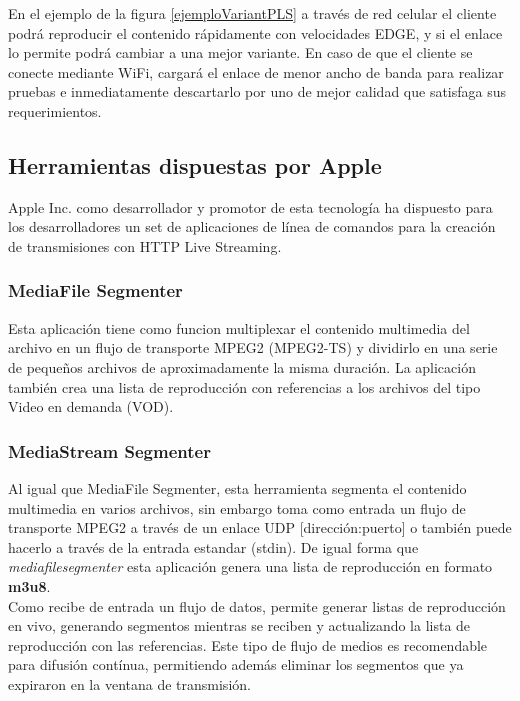 En el ejemplo de la figura \ref{ejemploVariantPLS} a través de red celular el cliente podrá reproducir el contenido rápidamente con velocidades EDGE, y si el enlace lo permite podrá cambiar a una mejor variante. En caso de que el cliente se conecte mediante WiFi, cargará el enlace de menor ancho de banda para realizar pruebas e inmediatamente descartarlo por uno de mejor calidad que satisfaga sus requerimientos.




	\subsection{Herramientas dispuestas por Apple}
	Apple Inc. como desarrollador y promotor de esta tecnología ha dispuesto para los desarrolladores un set de aplicaciones de línea de comandos para la creación de transmisiones con HTTP Live Streaming.
		\subsubsection{MediaFile Segmenter}
Esta aplicación tiene como funcion multiplexar el contenido multimedia del archivo en un flujo de transporte MPEG2 (MPEG2-TS) y dividirlo en una serie de pequeños archivos de aproximadamente la misma duración. La aplicación también crea una lista de reproducción con referencias a los archivos del tipo Video en demanda (VOD).

		\subsubsection{MediaStream Segmenter}
Al igual que MediaFile Segmenter, esta herramienta segmenta el contenido multimedia en varios archivos, sin embargo toma como entrada un flujo de transporte MPEG2 a través de un enlace UDP [dirección:puerto] o también puede hacerlo a través de la entrada estandar (stdin). De igual forma que \textit{mediafilesegmenter} esta aplicación genera una lista de reproducción en formato \textbf{m3u8}.\\

Como recibe de entrada un flujo de datos, permite generar listas de reproducción en vivo, generando segmentos mientras se reciben y actualizando la lista de reproducción con las referencias. Este tipo de flujo de medios es recomendable para difusión contínua, permitiendo además eliminar los segmentos que ya expiraron en la ventana de transmisión.

